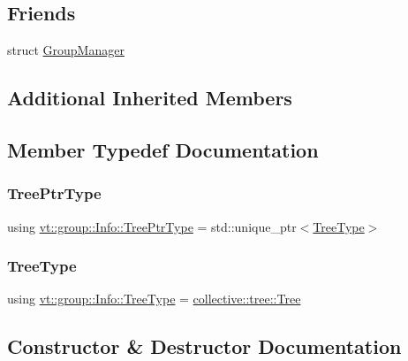 \subsection*{Friends}
\begin{DoxyCompactItemize}
\item 
struct \hyperlink{structvt_1_1group_1_1_info_a698f77439e02c4d3309fed882290c09c}{Group\+Manager}
\end{DoxyCompactItemize}
\subsection*{Additional Inherited Members}


\subsection{Member Typedef Documentation}
\mbox{\label{structvt_1_1group_1_1_info_ad381b46b3d09499ac670457aa3b5a0ba}} 
\subsubsection{\texorpdfstring{Tree\+Ptr\+Type}{TreePtrType}}
{\footnotesize\ttfamily using \hyperlink{structvt_1_1group_1_1_info_ad381b46b3d09499ac670457aa3b5a0ba}{vt\+::group\+::\+Info\+::\+Tree\+Ptr\+Type} =  std\+::unique\+\_\+ptr$<$\hyperlink{structvt_1_1group_1_1_info_base_a96e01b6097ed7b2bc299027d0a7a1b1e}{Tree\+Type}$>$}

\mbox{\label{structvt_1_1group_1_1_info_a7682ac1b37adcfcc2f10edee9d34bdc8}} 
\subsubsection{\texorpdfstring{Tree\+Type}{TreeType}}
{\footnotesize\ttfamily using \hyperlink{structvt_1_1group_1_1_info_a7682ac1b37adcfcc2f10edee9d34bdc8}{vt\+::group\+::\+Info\+::\+Tree\+Type} =  \hyperlink{structvt_1_1collective_1_1tree_1_1_tree}{collective\+::tree\+::\+Tree}}



\subsection{Constructor \& Destructor Documentation}
\mbox{\label{structvt_1_1group_1_1_info_ae1f69cd3040c001f9c6df8136293fffb}} 
